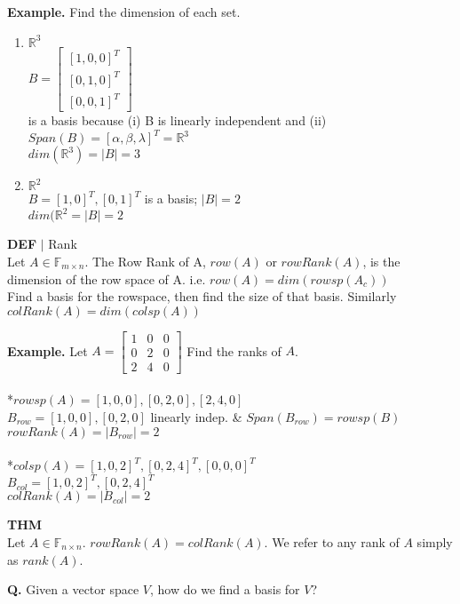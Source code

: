 \documentclass [12pt]{article}
\begin{document}
\pagebreak
\noindent\textbf{Example.} Find the dimension of each set.
\begin{enumerate}[\quad a)]
    \item $\mathbb{R}^3$\\
    $B=\begin{bmatrix}
    [1,0,0]^T\\
    [0,1,0]^T\\
    [0,0,1]^T
    \end{bmatrix}$\\ is a basis because (i) B is linearly independent and (ii) $Span(B)={[\alpha,\beta,\lambda]^T}=\mathbb{R}^3$\\
    $dim(\mathbb{R}^3)=|B|=3$
    \item $\mathbb{R}^2$\\
    $B={[1,0]^T,[0,1]^T}$ is a basis; $|B|=2$\\
    $dim(\mathbb{R}^2=|B|=2$
\end{enumerate}
\begin{framed}
\noindent\textbf{DEF} $|$ Rank\\
Let $A\in\mathbb{F}_{m\times n}$. The Row Rank of A, $row(A)$ or $rowRank(A)$, is the dimension of the row space of A. i.e. $row(A)=dim(rowsp(A_c))$\\
Find a basis for the rowspace, then find the size of that basis. Similarly $colRank(A)=dim(colsp(A))$
\end{framed}
\noindent\textbf{Example.} 
Let $A=\begin{bmatrix}
1&0&0\\
0&2&0\\
2&4&0
\end{bmatrix}$ Find the ranks of $A$.\\\\
*$rowsp(A)={[1,0,0],[0,2,0],[2,4,0]}$\\
$B_{row}={[1,0,0],[0,2,0]}$ linearly indep. \& $Span(B_{row})=rowsp(B)$\\
$rowRank(A)=|B_{row}|=2$\\\\
*$colsp(A)={[1,0,2]^T,[0,2,4]^T,[0,0,0]^T}$\\
$B_{col}={[1,0,2]^T,[0,2,4]^T}$\\
$colRank(A)=|B_{col}|=2$
\begin{framed}
\noindent\textbf{THM}\\
Let $A\in\mathbb{F}_{n\times n}.$ $rowRank(A)=colRank(A)$. We refer to any rank of $A$ simply as $rank(A)$.
\end{framed}
\noindent\textbf{Q.} Given a vector space $V$, how do we find a basis for $V$?
\end{document}
